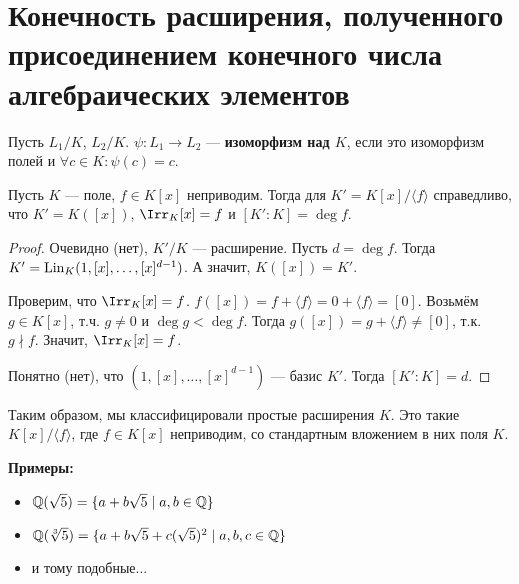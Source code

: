 \section{Конечность расширения, полученного присоединением конечного числа алгебраических элементов}
\begin{conj}
    Пусть $L_1 / K$, $L_2 / K$. $\psi : L_1 \to L_2$ --- \textbf{изоморфизм над $K$}, если это изоморфизм полей и $\forall c \in K : \psi(c) = c$. 
\end{conj}

\begin{theorem}
    Пусть $K$ --- поле, $f \in K[x]$ неприводим. Тогда для $K' = K[x] / \langle f \rangle$ справедливо, что $K' = K([x])$, $\Irr_K [x] = f$ и $[K' : K] = \deg f$.
\end{theorem}
\begin{proof}
    Очевидно (нет), $K' / K$ --- расширение. Пусть $d = \deg f$. Тогда \\ $K' = \operatorname{Lin}_K(1, [x], \dots, [x]^{d-1})$. А значит, $K([x]) = K'$.

    Проверим, что $\Irr_K [x] = f$. $f([x]) = f + \langle f \rangle =
    0 + \langle f \rangle = [0]$. Возьмём $g \in K[x]$, т.ч. $g \neq 0$ и $\deg g < \deg f$. Тогда $g([x]) = g + \langle f \rangle \neq [0]$, т.к. $g \nmid f$. Значит, $\Irr_K [x] = f$.

    Понятно (нет), что $(1, [x], \dots, [x]^{d-1})$ --- базис $K'$.
    Тогда $[K' : K] = d$.
\end{proof}

Таким образом, мы классифицировали простые расширения $K$. Это такие $K[x] / \langle f \rangle$, где $f \in K[x]$ неприводим, со стандартным вложением в них поля $K$.

\textbf{Примеры:}
\begin{itemize}
    \item $\mathbb{Q}(\sqrt{5}) = \{ a + b \sqrt{5} \mid a, b \in \mathbb{Q} \}$
    \item $\mathbb{Q}(\sqrt[3]{5}) = \{ a + b \sqrt{5} + c(\sqrt{5})^2 \mid a, b, c \in \mathbb{Q} \}$
    \item и тому подобные...
\end{itemize} 

